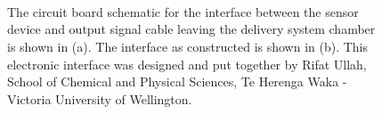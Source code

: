 \documentclass[
  a4paper,
]{scrbook}
\begin{document}
\begin{figure}
\begin{minipage}[t]{0.85\linewidth}
{}

\end{minipage}%
%
\begin{minipage}[t]{0.06\linewidth}

{\centering 

~

}

\end{minipage}%
\newline
\begin{minipage}[t]{0.03\linewidth}

{\centering 


}

\end{minipage}%
%
\begin{minipage}[t]{0.10\linewidth}

{\centering 

~

}

\end{minipage}%
%
\begin{minipage}[t]{0.77\linewidth}

{\centering 


}

\end{minipage}%
%
\begin{minipage}[t]{0.10\linewidth}

{\centering 

~

}

\end{minipage}%

\caption{\label{fig-device-interface}The circuit board schematic for the
interface between the sensor device and output signal cable leaving the
delivery system chamber is shown in (a). The interface as constructed is
shown in (b). This electronic interface was designed and put together by
Rifat Ullah, School of Chemical and Physical Sciences, Te Herenga Waka -
Victoria University of Wellington.}

\end{figure}
\end{document}
